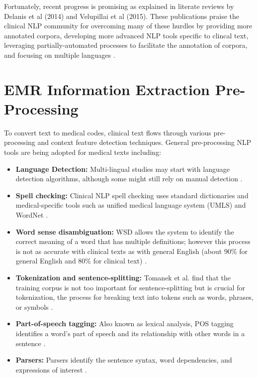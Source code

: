\documentclass[sigconf]{acmart}
\begin{document}
Fortunately, recent progress is promising as explained in literate reviews by Delanis et al (2014) and Velupillai et al (2015). These publications praise the clinical NLP community for overcoming many of these hurdles by providing more annotated corpora, developing more advanced NLP tools specific to clincal text, leveraging partially-automated processes to facilitate the annotation of corpora, and focusing on multiple languages \cite{dalianis2014didactic} \cite{velupillai2015recent}.



\section{EMR Information Extraction Pre-Processing}
To convert text to medical codes, clinical text flows through various pre-processing and context feature detection techniques. General pre-processing NLP tools are being adopted for medical texts including:
\begin{itemize}
\item \textbf{Language Detection:} Multi-lingual studies may start with language detection algorithms, although some might still rely on manual detection \cite{diomaiuta2017novel}.
\item \textbf{Spell checking:} Clinical NLP spell checking uses standard dictionaries and medical-specific tools such as unified medical language system (UMLS) and WordNet \cite{meystre2008extracting}.
\item \textbf{Word sense disambiguation:} WSD allows the system to identify the correct meaning of a word that has multiple definitions; however this process is not as accurate with clinical texts as with general English (about 90\% for general English and 80\% for clinical text) \cite{meystre2008extracting}.
\item \textbf{Tokenization and sentence-splitting:}  Tomanek et al. find that the training corpus is not too important for sentence-splitting but is crucial for tokenization, the process for breaking text into tokens such as words, phrases, or symbols \cite{tomanek2007sentence}\cite{diomaiuta2017novel}.
\item \textbf{Part-of-speech tagging:} Also known as lexical analysis, POS tagging identifies a word's part of speech and its relationship with other words in a sentence \cite{meystre2008extracting}\cite{diomaiuta2017novel}.
\item \textbf{Parsers:} Parsers identify the sentence syntax, word dependencies, and expressions of interest \cite{meystre2008extracting}\cite{diomaiuta2017novel}.
\end{itemize}
\end{document}
